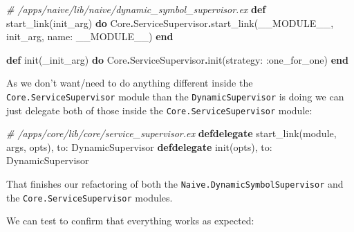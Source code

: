\documentclass[
]{book}
\newenvironment{Shaded}{\begin{snugshade}}{\end{snugshade}}
\newcommand{\CommentTok}[1]{\textcolor[rgb]{0.56,0.35,0.01}{\textit{#1}}}
\newcommand{\ConstantTok}[1]{\textcolor[rgb]{0.00,0.00,0.00}{#1}}
\newcommand{\KeywordTok}[1]{\textcolor[rgb]{0.13,0.29,0.53}{\textbf{#1}}}
\newcommand{\NormalTok}[1]{#1}
\newcommand{\OperatorTok}[1]{\textcolor[rgb]{0.81,0.36,0.00}{\textbf{#1}}}
\newcommand{\VariableTok}[1]{\textcolor[rgb]{0.00,0.00,0.00}{#1}}
\begin{document}
\begin{Shaded}
\begin{Highlighting}[]
  \CommentTok{\# /apps/naive/lib/naive/dynamic\_symbol\_supervisor.ex}
  \KeywordTok{def}\NormalTok{ start\_link(init\_arg) }\KeywordTok{do}
    \ConstantTok{Core}\OperatorTok{.}\ConstantTok{ServiceSupervisor}\OperatorTok{.}\NormalTok{start\_link(}\ConstantTok{\_\_MODULE\_\_}\NormalTok{, init\_arg, }\VariableTok{name:} \ConstantTok{\_\_MODULE\_\_}\NormalTok{)}
  \KeywordTok{end}

  \KeywordTok{def}\NormalTok{ init(\_init\_arg) }\KeywordTok{do}
    \ConstantTok{Core}\OperatorTok{.}\ConstantTok{ServiceSupervisor}\OperatorTok{.}\NormalTok{init(}\VariableTok{strategy:} \VariableTok{:one\_for\_one}\NormalTok{)}
  \KeywordTok{end}
\end{Highlighting}
\end{Shaded}

As we don't want/need to do anything different inside the \texttt{Core.ServiceSupervisor} module than the \texttt{DynamicSupervisor} is doing we can just delegate both of those inside the \texttt{Core.ServiceSupervisor} module:

\begin{Shaded}
\begin{Highlighting}[]
  \CommentTok{\# /apps/core/lib/core/service\_supervisor.ex}
  \KeywordTok{defdelegate}\NormalTok{ start\_link(module, args, opts), }\VariableTok{to:} \ConstantTok{DynamicSupervisor}
  \KeywordTok{defdelegate}\NormalTok{ init(opts), }\VariableTok{to:} \ConstantTok{DynamicSupervisor}
\end{Highlighting}
\end{Shaded}

That finishes our refactoring of both the \texttt{Naive.DynamicSymbolSupervisor} and the \texttt{Core.ServiceSupervisor} modules.

We can test to confirm that everything works as expected:
\end{document}
